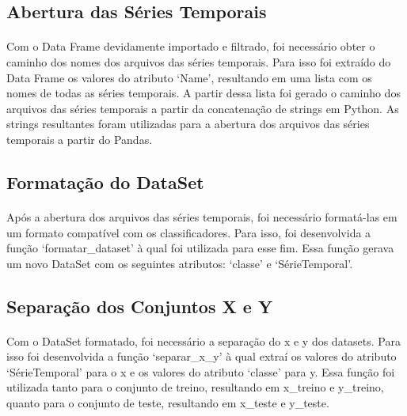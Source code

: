 \documentclass[12pt]{article}
\begin{document}
\subsection{Abertura das Séries Temporais}

\paragraph{}Com o Data Frame devidamente importado e filtrado, foi necessário obter o caminho dos nomes dos arquivos das séries temporais. Para isso foi extraído do Data Frame os valores do atributo ‘Name’, resultando em uma lista com os nomes de todas as séries temporais. A partir dessa lista foi gerado o caminho dos arquivos das séries temporais a partir da concatenação de strings em Python. As strings resultantes foram utilizadas para a abertura dos arquivos das séries temporais a partir do Pandas.

\subsection{Formatação do DataSet}

\paragraph{}Após a abertura dos arquivos das séries temporais, foi necessário formatá-las em um formato compatível com os classificadores. Para isso, foi desenvolvida a função ‘formatar\_dataset’ à qual foi utilizada para esse fim. Essa função gerava um novo DataSet com os seguintes atributos: ‘classe’ e ‘SérieTemporal’.



\subsection{Separação dos Conjuntos X e Y}

\paragraph{}Com o DataSet formatado, foi necessário a separação do x e y dos datasets. Para isso foi desenvolvida a função ‘separar\_x\_y’ à qual extraí os valores do atributo ‘SérieTemporal’ para o x e os valores do atributo ‘classe’ para y. Essa função foi utilizada tanto para o conjunto de treino, resultando em x\_treino e y\_treino, quanto para o conjunto de teste, resultando em x\_teste e y\_teste.
\end{document}
